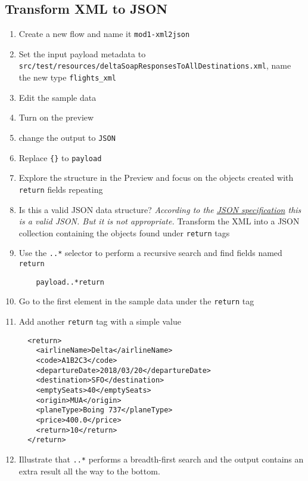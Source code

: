 \subsection{Transform XML to JSON}
\begin{enumerate}[resume*]
\item Create a new flow and name it \texttt{mod1-xml2json}
\item Set the input payload metadata to \texttt{src/test/resources/deltaSoapResponsesToAllDestinations.xml}, name the new type \texttt{flights\_xml}
\item Edit the sample data
\item Turn on the preview
\item change the output to \texttt{JSON}
\item Replace \texttt{\{\}} to \texttt{payload}
\item Explore the structure in the Preview and focus on the objects created with \texttt{return} fields repeating
\item Is this a valid JSON data structure?
  \newline
  \emph{
    According to the \href{https://www.ecma-international.org/publications/files/ECMA-ST/ECMA-404.pdf}{JSON specification} this is a valid JSON. But it is not appropriate.
  }
  \newline
  Transform the XML into a JSON collection containing the objects found under \texttt{return} tags
\item Use the \texttt{..*} selector to perform a recursive search and find fields named \texttt{return}
  \begin{lstlisting}
    payload..*return
  \end{lstlisting}
\item Go to the first element in the sample data under the \texttt{return} tag
\item Add another \texttt{return} tag with a simple value
\begin{lstlisting}
  <return>
    <airlineName>Delta</airlineName>
    <code>A1B2C3</code>
    <departureDate>2018/03/20</departureDate>
    <destination>SFO</destination>
    <emptySeats>40</emptySeats>
    <origin>MUA</origin>
    <planeType>Boing 737</planeType>
    <price>400.0</price>
    <return>10</return>
  </return>
\end{lstlisting}
\item Illustrate that \texttt{..*} performs a breadth-first search and the output contains an extra result all the way to the bottom. 

\end{enumerate}
